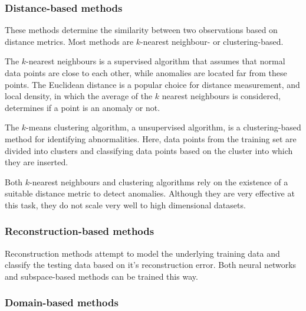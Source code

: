 \subsubsection{Distance-based methods}

These methods determine the similarity between two observations based on distance metrics. Most methods are $k$-nearest neighbour- or clustering-based.\par
The $k$-nearest neighbours is a supervised algorithm that assumes that normal data points are close to each other, while anomalies are located far from these points. The Euclidean distance is a popular choice for distance measurement, and local density, in which the average of the $k$ nearest neighbours is considered, determines if a point is an anomaly or not.\par
The $k$-means clustering algorithm, a unsupervised algorithm, is a clustering-based method for identifying abnormalities. Here, data points from the training set are divided into clusters and classifying data points based on the cluster into which they are inserted.\par
Both $k$-nearest neighbours and clustering algorithms rely on the existence of a suitable distance metric to detect anomalies. Although they are very effective at this task, they do not scale very well to high dimensional datasets.

\subsubsection{Reconstruction-based methods}

Reconstruction methods attempt to model the underlying training data and classify the testing data based on it's reconstruction error. Both neural networks and subspace-based methods can be trained this way.

\subsubsection{Domain-based methods}

